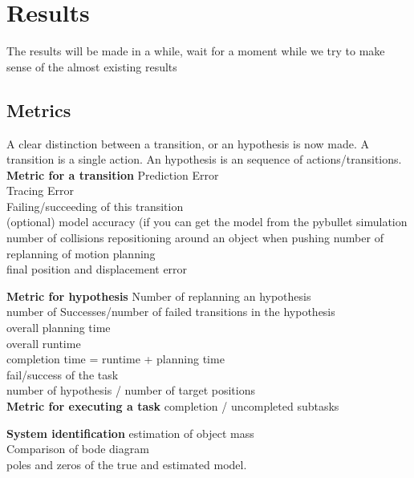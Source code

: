 \chapter{Results}


The results will be made in a while, wait for a moment while we try to make sense of the almost existing results



\section{Metrics}
A clear distinction between a transition, or an hypothesis is now made. A transition is a single action. An hypothesis is an sequence of actions/transitions.\\

\textbf{Metric for a transition}
\newline
Prediction Error\\
Tracing Error\\
Failing/succeeding of this  transition\\
(optional) model accuracy (if you can get the model from the pybullet simulation
number of collisions
repositioning around an object when pushing
number of replanning of motion planning\\
final position and displacement error\\


\textbf{Metric for hypothesis}
\newline
Number of replanning an hypothesis\\
number of Successes/number of failed transitions in the hypothesis\\
overall planning time\\
overall runtime\\
completion time = runtime + planning time\\
fail/success of the task\\
number of hypothesis / number of target positions\\

\textbf{Metric for executing a task}
completion / uncompleted subtasks


\textbf{System identification}
\newline
estimation of object mass\\
Comparison of bode diagram\\
poles and zeros of the true and estimated model.\\


